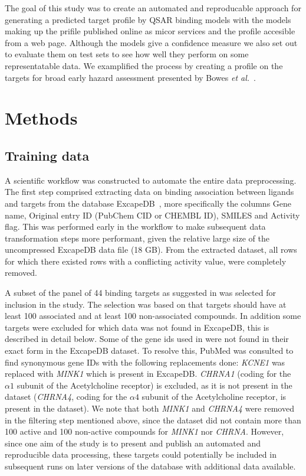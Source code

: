 \documentclass[10pt,article]{memoir}
\begin{document}
The goal of this study was to create an automated and reproducable approach for
generating a predicted target profile by QSAR binding models with the models
making up the prifile published online as micor services and the profile
accesible from a web page. Although the models give a confidence measure we
also set out to evaluate them on test sets to see how well they perform on some
representatable data. We examplified the process by creating a profile on the
targets for broad early hazard assessment presented by Bowes \textit{et
al.}~\cite{Bowes2012}.

\section*{Methods}

\subsection{Training data}

A scientific workflow was constructed to automate the entire data preprocessing.
The first step comprised extracting data on binding association between ligands and targets from the database ExcapeDB~\cite{Sun2017}, more specifically the columns Gene name, Original entry ID (PubChem CID or CHEMBL ID), SMILES and Activity flag. This was performed early in the workflow to make subsequent data transformation steps more performant, given the relative large size of the
uncompressed ExcapeDB data file (18 GB).
%
From the extracted dataset, all rows for which there existed rows with a conflicting
activity value, were completely removed.

A subset of the panel of 44 binding targets as suggested in \cite{Bowes2012}
was selected for inclusion in the study. The selection was based on that targets
should have at least 100 associated and at least 100 non-associated compounds. 
In addition some targets were excluded for which data was not found in ExcapeDB, this is described in detail below.
%
Some of the gene ids used in \cite{Bowes2012} were not found in their exact
form in the ExcapeDB dataset. To resolve this, PubMed was consulted to find
synonymous gene IDs with the following replacements done:
%
\textit{KCNE1} was replaced with \textit{MINK1} which is present in ExcapeDB.
\textit{CHRNA1} (coding for the $\alpha1$ subunit of the Acetylcholine
receptor) is excluded, as it is not present in the dataset (\textit{CHRNA4},
coding for the $\alpha4$ subunit of the Acetylcholine receptor, is present in
the dataset). We note that both \textit{MINK1} and \textit{CHRNA4} were removed in the filtering
step mentioned above, since the dataset did not contain more than 100 active
and 100 non-active compounds for \textit{MINK1} nor \textit{CHRNA}. 
However, since one aim of the study is to present and publish an automated and
reproducible data processing, these targets could potentially be included in
subsequent runs on later versions of the database with additional data
available.
\end{document}
